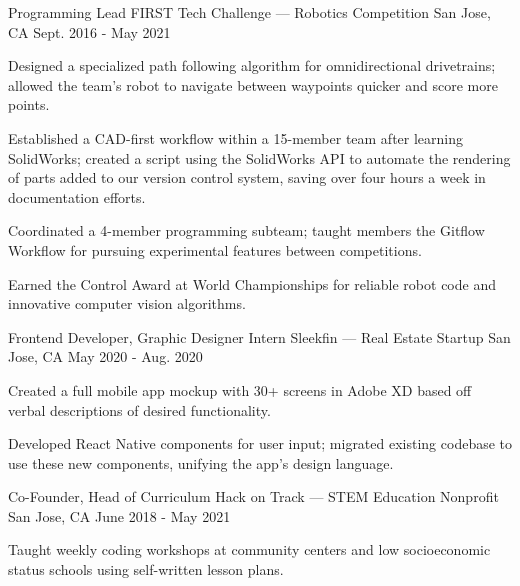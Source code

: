 
\begin{cventries}
  \cventry
  {Programming Lead} %
  {FIRST Tech Challenge --- Robotics Competition} %
  {San Jose, CA} %
  {Sept. 2016 - May 2021} %
  {
    \begin{cvitems} %
      \item {Designed a specialized path following algorithm for omnidirectional drivetrains; allowed the team's robot to navigate between waypoints quicker and score more points.}
      \item {Established a CAD-first workflow within a 15-member team after learning SolidWorks; created a script using the SolidWorks API to automate the rendering of parts added to our version control system, saving over four hours a week in documentation efforts.}
      \item {Coordinated a 4-member programming subteam; taught members the Gitflow Workflow for pursuing experimental features between competitions.}
      \item {Earned the Control Award at World Championships for reliable robot code and innovative computer vision algorithms.}
    \end{cvitems}
  }

  \cventry
  {Frontend Developer, Graphic Designer Intern} %
  {Sleekfin --- Real Estate Startup} %
  {San Jose, CA} %
  {May 2020 - Aug. 2020} %
  {
    \begin{cvitems} %
      \item {Created a full mobile app mockup with 30+ screens in Adobe XD based off verbal descriptions of desired functionality.}
      \item {Developed React Native components for user input; migrated existing codebase to use these new components, unifying the app's design language.}
    \end{cvitems}
  }

  \cventry
  {Co-Founder, Head of Curriculum} %
  {Hack on Track --- STEM Education Nonprofit} %
  {San Jose, CA} %
  {June 2018 - May 2021} %
  {
    \begin{cvitems} %
      \item {Taught weekly coding workshops at community centers and low socioeconomic status schools using self-written lesson plans.}
    \end{cvitems}
  }
\end{cventries}
